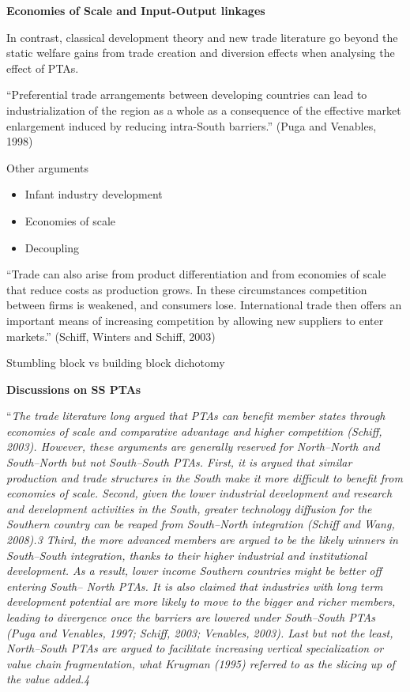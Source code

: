 \documentclass{article}%
\begin{document}
\textbf{Economies of Scale and Input-Output linkages}

In contrast, classical development theory and new trade literature go
beyond the static welfare gains from trade creation and diversion
effects when analysing the effect of PTAs.

``Preferential trade arrangements between developing countries can lead
to industrialization of the region as a whole as a consequence of the
effective market enlargement induced by reducing intra-South barriers.''
(Puga and Venables, 1998)

Other arguments

\begin{itemize}
\item
  Infant industry development
\item
  Economies of scale
\item
  Decoupling
\end{itemize}

``Trade can also arise from product differentiation and from economies
of scale that reduce costs as production grows. In these circumstances
competition between firms is weakened, and consumers lose. International
trade then offers an important means of increasing competition by
allowing new suppliers to enter markets.'' (Schiff, Winters and Schiff,
2003)

Stumbling block vs building block dichotomy

\textbf{Discussions on SS PTAs}

``\emph{The trade literature long argued that PTAs can benefit member
states through economies of scale and comparative advantage and higher
competition (Schiff, 2003). However, these arguments are generally
reserved for North--North and South--North but not South--South PTAs.
First, it is argued that similar production and trade structures in the
South make it more difficult to benefit from economies of scale. Second,
given the lower industrial development and research and development
activities in the South, greater technology diffusion for the Southern
country can be reaped from South--North integration (Schiff and Wang,
2008).3 Third, the more advanced members are argued to be the likely
winners in South--South integration, thanks to their higher industrial
and institutional development. As a result, lower income Southern
countries might be better off entering South-- North PTAs. It is also
claimed that industries with long term development potential are more
likely to move to the bigger and richer members, leading to divergence
once the barriers are lowered under South--South PTAs (Puga and
Venables, 1997; Schiff, 2003; Venables, 2003). Last but not the least,
North--South PTAs are argued to facilitate increasing vertical
specialization or value chain fragmentation, what Krugman (1995)
referred to as the slicing up of the value added.4}
\end{document}
